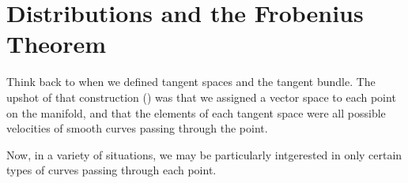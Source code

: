 
\section{Distributions and the Frobenius Theorem}
\label{sec:distributions}

Think back to  when we defined tangent spaces and the tangent bundle. The upshot of that construction () was that we assigned a vector space to each point on the manifold, and that the elements of each tangent space were all possible velocities of smooth curves passing through the point.

Now, in a variety of situations, we may be particularly intgerested in only certain types of curves passing through each point.

